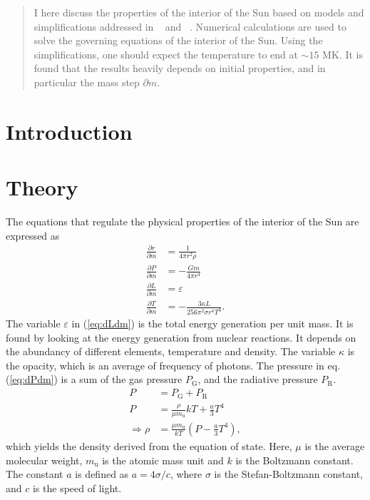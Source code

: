 \documentclass[a4paper, 11pt, english]{article}
\author{Vedad Hodzic}
\newcommand{\refeq}[1]{(\textcolor{red}{\ref{eq:#1}})} %
\begin{document}
\begin{titlepage}
    \thispagestyle{empty}
    
\end{titlepage}

\begin{abstract}
	I here discuss the properties of the interior of the Sun based on models and
	simplifications addressed in ~\cite{stix} and ~\cite{gudiksen}. Numerical calculations
	are used to solve the governing equations of the interior of the Sun. Using the 
	simplifications, one should expect the temperature to end at $\sim15$ MK. It is found
	that the results heavily depends on initial properties, and in particular the mass
	step $\partial m$.
\end{abstract}

\section{Introduction}

\section{Theory}

The equations that regulate the physical properties of the interior of the Sun are
expressed as
\begin{align}
	\frac{\partial r}{\partial m} &= \frac{1}{4\pi r^2 \rho} \label{eq:drdm} \\
	\frac{\partial P}{\partial m} &= -\frac{Gm}{4\pi r^4} \label{eq:dPdm} \\
	\frac{\partial L}{\partial m} &= \varepsilon \label{eq:dLdm} \\
	\frac{\partial T}{\partial m} &= -\frac{3 \kappa L}{256 \pi^2 \sigma r^4 T^3}. 
	\label{eq:dTdm} 
\end{align}
The variable $\varepsilon$ in \refeq{dLdm} is the total energy generation per unit mass.
It is found by looking at the energy generation from nuclear reactions. It depends on the
abundancy of different elements, temperature and density. The variable $\kappa$ is the
opacity, which is an average of frequency of photons.
The pressure in eq. \refeq{dPdm} is a sum of the gas pressure $P_{\mathrm{G}}$, and the radiative
pressure $P_{\mathrm{R}}$. 
\begin{align}
	P &= P_{\mathrm{G}} + P_{\mathrm{R}} \nonumber \\
	P &= \frac{\rho}{\mu m_{\mathrm{u}}} kT + \frac{a}{3}T^4 \nonumber \\
	\Rightarrow \rho &= \frac{\mu m_{\mathrm{u}}}{kT} \left( P - \frac{a}{3}T^4 \right),
	\label{eq:density}
\end{align}
which yields the density derived from the equation of state. Here, $\mu$ is the average
molecular weight, $m_{\mathrm{u}}$ is the atomic mass unit and $k$ is the Boltzmann
constant. The constant $a$ is defined as $a = 4\sigma / c$, where $\sigma$ is the
Stefan-Boltzmann constant, and $c$ is the speed of light.
\end{document}
